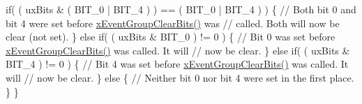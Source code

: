\begin{DoxyPre}    if( ( uxBits \& ( BIT\_0 | BIT\_4 ) ) == ( BIT\_0 | BIT\_4 ) )
    \{
        // Both bit 0 and bit 4 were set before \mbox{\hyperlink{event__groups_8h_a0fb72cfdd4f0d5f86d955fc3af448f2a}{xEventGroupClearBits()}} was
        // called.  Both will now be clear (not set).
    \}
    else if( ( uxBits \& BIT\_0 ) != 0 )
    \{
        // Bit 0 was set before \mbox{\hyperlink{event__groups_8h_a0fb72cfdd4f0d5f86d955fc3af448f2a}{xEventGroupClearBits()}} was called.  It will
        // now be clear.
    \}
    else if( ( uxBits \& BIT\_4 ) != 0 )
    \{
        // Bit 4 was set before \mbox{\hyperlink{event__groups_8h_a0fb72cfdd4f0d5f86d955fc3af448f2a}{xEventGroupClearBits()}} was called.  It will
        // now be clear.
    \}
    else
    \{
        // Neither bit 0 nor bit 4 were set in the first place.
    \}
  \}
  \end{DoxyPre}
 